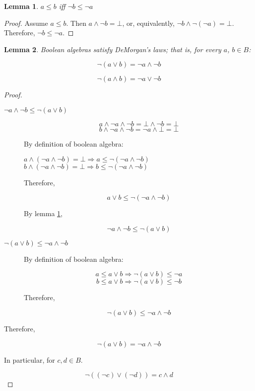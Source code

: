 \documentclass[notitlepage,a4paper]{article}
\newtheorem{lemma}{Lemma}
\begin{document}
\begin{enumerate}
     \begin{lemma}\label{lem:compl-rev}
       $a ≤ b$ iff $¬b ≤ ¬a$
     \end{lemma}
     \begin{proof}
       Assume $a ≤ b$. Then $a ∧ ¬b = ⊥$, or, equivalently,
       $¬b ∧ ¬(¬a) = ⊥$. Therefore, $¬b ≤ ¬a$.
     \end{proof}

     \begin{lemma}\label{lem:morgan}
       Boolean algebras satisfy DeMorgan's laws; that is, for every
       $a$, $b ∈ B$:

       $$¬(a ∨ b) = ¬a ∧ ¬b$$

       $$¬(a ∧ b) = ¬a ∨ ¬b$$
       
     \end{lemma}

     \begin{proof}
       \begin{description}
         \item[$¬a ∧ ¬b ≤ ¬(a ∨ b)$]

           $$a ∧ ¬a ∧ ¬b = ⊥ ∧ ¬b = ⊥$$
           $$b ∧ ¬a ∧ ¬b = ¬a ∧ ⊥ = ⊥$$

           By definition of boolean algebra:

           $a ∧ (¬a ∧ ¬b) = ⊥ \Rightarrow a ≤ ¬(¬a ∧ ¬b)$
           $b ∧ (¬a ∧ ¬b) = ⊥ \Rightarrow b ≤ ¬(¬a ∧ ¬b)$

           Therefore,

           $$a ∨ b ≤ ¬(¬a ∧ ¬b)$$

           By lemma \ref{lem:compl-rev},

           $$¬a ∧ ¬b ≤ ¬(a ∨ b)$$

         \item[$¬(a ∨ b) ≤ ¬a ∧ ¬b$]

           By definition of boolean algebra:

           $$a ≤ a ∨ b ⇒ ¬(a ∨ b) ≤ ¬a$$
           $$b ≤ a ∨ b ⇒ ¬(a ∨ b) ≤ ¬b$$

           Therefore,

           $$¬(a ∨ b) ≤ ¬a ∧ ¬b$$
       \end{description} 

       Therefore,

       $$¬(a ∨ b) = ¬a ∧ ¬b$$

       In particular, for $c,d ∈ B$.

       $$¬((¬c) ∨ (¬d)) = c ∧ d$$


\end{proof}
\end{enumerate}
\end{document}
